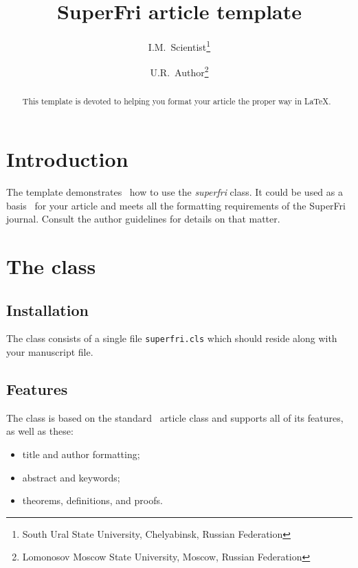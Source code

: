 \documentclass{superfri}
\begin{document}
\author{I.M.~Scientist\footnote{\label{susu}South Ural State University, Chelyabinsk, Russian Federation} \and U.R.~Author\footnote{\label{msu}Lomonosov Moscow State University, Moscow, Russian Federation}}

\title{SuperFri article template}

\maketitle{}

\begin{abstract}%
This template is devoted to helping you format your article the proper way in
\LaTeX.

\end{abstract}

\section*{Introduction}
\label{sec:intro}
The template demonstrates~\cite{DBLP:conf/ics/2015} how to use the \emph{superfri} class. It could be
used as a basis~\cite{DBLP:conf/iccS/AltintasNLKDS16} for your article and meets all the formatting requirements of
the SuperFri journal. Consult the author
guidelines for details on that matter.

\section{The class}
\label{sec:class}

\subsection{Installation}
\label{sec:install}
The class consists of a single file \verb=superfri.cls= which should reside
along with your manuscript file.

\subsection{Features}
\label{sec:features}
The class is based on the standard~\cite{DBLP:books/sp/byeon2010/RiedelSMWL10} article class and supports all of its
features, as well as these:
\begin{itemize}
\item title and author formatting;
\item abstract and keywords;
\item theorems, definitions, and proofs.
\end{itemize}
\end{document}
